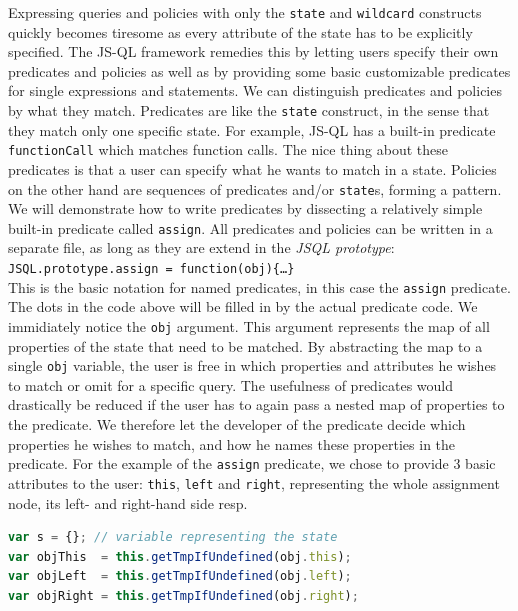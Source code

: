 Expressing queries and policies with only the \texttt{state} and \texttt{wildcard} constructs quickly becomes tiresome as every attribute of the state has to be explicitly specified. The JS-QL framework remedies this by letting users specify their own predicates and policies as well as by providing some basic customizable predicates for single expressions and statements.
We can distinguish predicates and policies by what they match. Predicates are like the \texttt{state} construct, in the sense that they match only one specific state. For example, JS-QL has a built-in predicate \texttt{functionCall} which matches function calls. The nice thing about these predicates is that a user can specify what he wants to match in a state. Policies on the other hand are sequences of predicates and/or \texttt{state}s, forming a pattern. We will demonstrate how to write predicates by dissecting a relatively simple built-in predicate called \texttt{assign}. All predicates and policies can be written in a separate file, as long as they are extend in the \textit{JSQL prototype}:\\
\texttt{JSQL.prototype.assign = function(obj)\{\ldots \}}\\
This is the basic notation for named predicates, in this case the \texttt{assign} predicate. The dots in the code above will be filled in by the actual predicate code. We immidiately notice the \texttt{obj} argument. This argument represents the map of all properties of the state that need to be matched. By abstracting the map to a single \texttt{obj} variable, the user is free in which properties and attributes he wishes to match or omit for a specific query. The usefulness of predicates would drastically be reduced if the user has to again pass a nested map of properties to the predicate. We therefore let the developer of the predicate decide which properties he wishes to match, and how he names these properties in the predicate. For the example of the \texttt{assign} predicate, we chose to provide 3 basic attributes to the user: \texttt{this}, \texttt{left} and \texttt{right}, representing the whole assignment node, its left- and right-hand side resp.
\begin{lstlisting}[label={lst:predicateArguments},language=JavaScript, caption=State properties of the \texttt{assign} predicate,mathescape=true]
var s = {}; // variable representing the state
var objThis  = this.getTmpIfUndefined(obj.this); 
var objLeft  = this.getTmpIfUndefined(obj.left); 
var objRight = this.getTmpIfUndefined(obj.right); 
\end{lstlisting}

